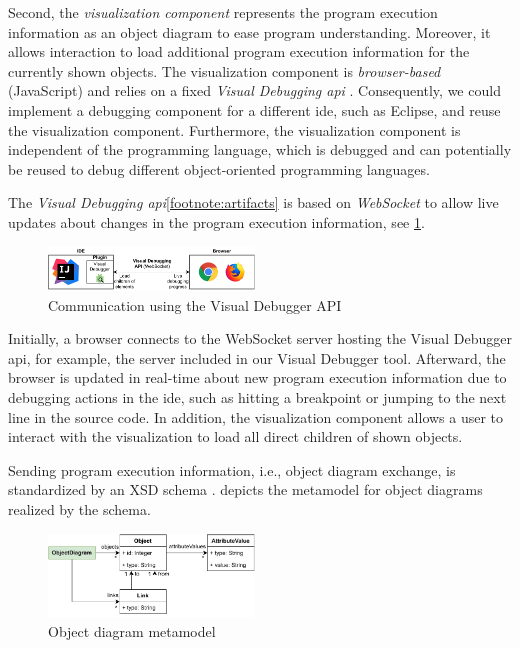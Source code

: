 \documentclass[conference]{IEEEtran}
\begin{document}
Second, the \textit{visualization component} represents the program execution information as an object diagram to ease program understanding.
Moreover, it allows interaction to load additional program execution information for the currently shown objects.
The visualization component is \emph{browser-based} (JavaScript) and relies on a fixed \emph{Visual Debugging \gls*{api}} \cite{ArtifactsICSME2022}.
Consequently, we could implement a debugging component for a different \gls*{ide}, such as Eclipse, and reuse the visualization component.
Furthermore, the visualization component is independent of the programming language, which is debugged and can potentially be reused to debug different object-oriented programming languages.

The \textit{Visual Debugging \gls*{api}}\cref{footnote:artifacts} is based on \emph{WebSocket} to allow live updates about changes in the program execution information, see \cref{fig:api}.

\begin{figure}[h]
    \centering
    \includegraphics[width=0.488\textwidth]{images/VD-architecture.pdf}
    \caption{Communication using the Visual Debugger API}
    \label{fig:api}
\end{figure}

Initially, a browser connects to the WebSocket server hosting the Visual Debugger \gls*{api}, for example, the server included in our Visual Debugger tool.
Afterward, the browser is updated in real-time about new program execution information due to debugging actions in the \gls*{ide}, such as hitting a breakpoint or jumping to the next line in the source code.
In addition, the visualization component allows a user to interact with the visualization to load all direct children of shown objects.

Sending program execution information, i.e., object diagram exchange, is standardized by an XSD schema \cite{ArtifactsICSME2022}.
 depicts the metamodel for object diagrams realized by the schema.

\begin{figure}[h]
    \centering
    \includegraphics[width=0.488\textwidth]{images/VD-metamodel.pdf}
    \caption{Object diagram metamodel}
    \label{fig:odMetamodel}
\end{figure}
\end{document}
